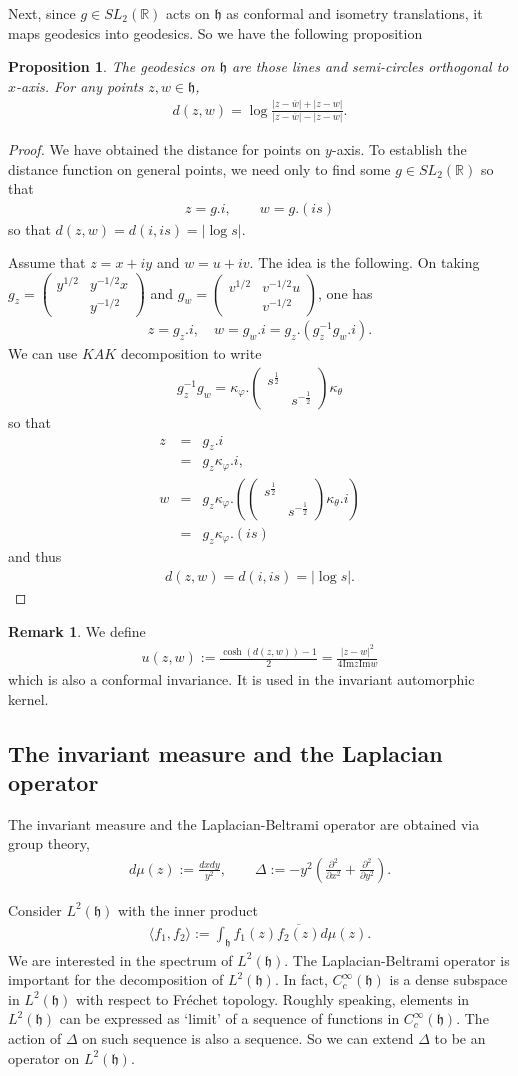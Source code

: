 \documentclass[11pt,reqno]{amsart}
\newcommand{\bea}{\begin{eqnarray}}
\newcommand{\eea}{\end{eqnarray}}
\newcommand{\bna}{\begin{eqnarray*}}
\newcommand{\ena}{\end{eqnarray*}}
\newcommand{\bma}{\begin{pmatrix}}
\newcommand{\ema}{\end{pmatrix}}
\newcommand{\mk}{\mathfrak}
\def\im{{\mathrm{Im}}}
\def\R{\mathbb{R}}
\newtheorem{prop}[lemma]{Proposition}
\theoremstyle{definition}
\newtheorem{remark}{Remark}
\begin{document}
Next, since $g\in SL_2(\R)$ acts on $\mk h$ as conformal and isometry translations,
it maps geodesics into geodesics. So we have the following proposition
\begin{prop}
The geodesics on $\mk h$ are those lines and semi-circles orthogonal to $x$-axis.
For any points $z,w\in \mk h$,
\bna
d(z,w)=\log\frac{|z-\overline w|+|z-w|}{|z-\overline w|-|z-w|}.
\ena
\end{prop}
\begin{proof}
We have obtained the distance for points on $y$-axis.
To establish the distance function on general  points,
we need only to find some $g\in SL_2(\R)$ so that
\bna
z=g.i,\qquad w=g.(is)
\ena
so that $d(z,w)=d(i,is)=|\log s|$.

Assume that $z=x+iy$ and $w=u+iv$. The idea is the following.
On taking $g_z=\bma y^{1/2}& y^{-1/2}x\\&y^{-1/2}\ema$ and $g_w=
\bma v^{1/2}& v^{-1/2}u\\&v^{-1/2}\ema$, one has
\bna
z=g_z.i,\quad w=g_w.i=g_z.(g_z^{-1}g_w.i).
\ena
We can use $KAK$ decomposition to write
\bna
g_z^{-1}g_w= \kappa_\varphi.\bma s^{\frac{1}{2}}&\\&s^{-\frac{1}{2}}\ema \kappa_\theta
\ena
so that
\bna
z&=&g_z.i\\
&=&g_z\kappa_\varphi.i,\\
w&=&g_z\kappa_\varphi.\left(\bma s^{\frac{1}{2}}&\\&s^{-\frac{1}{2}}\ema \kappa_\theta.i\right)\\
&=&g_z\kappa_\varphi.(is)
\ena
and thus
\bna
d(z,w)=d(i,is)=|\log s|.
\ena
\end{proof}
\begin{remark}We define
\bea
u(z,w):=\frac{\cosh(d(z,w))-1}{2}=\frac{|z-w|^2}{4\im z\im w}\label{u-function-conformal-invariance}
\eea
which is also a conformal invariance. It is used in the invariant automorphic kernel.
\end{remark}
\subsection{The invariant measure and the Laplacian operator}
The invariant measure and the Laplacian-Beltrami operator are obtained
via group theory,
\bna
 d\mu(z):=\frac{dxdy}{y^2},
 \qquad \Delta:=-y^2
 \left(\frac{\partial ^2}{\partial x^2}+\frac{\partial ^2}{\partial y^2}\right).
\ena

Consider $L^2(\mk h)$ with the inner product
\bna
\langle f_1,f_2\rangle:=\int_{\mathfrak h}f_1(z)\overline{f_2(z)}d\mu(z).
\ena
We are interested in the spectrum of $L^2(\mathfrak h)$.
The Laplacian-Beltrami operator is important for the decomposition of $L^2(\mk h)$.
In fact, $C_c^\infty(\mk h)$
is a dense subspace in $L^2(\mk h)$ with respect to Fr\'echet topology.
Roughly speaking, elements in $L^2(\mk h)$ can be expressed as `limit' of
 a sequence of
functions in $C_c^\infty(\mk h)$.
The action of $\Delta$ on such sequence is also a sequence.
So we can extend $\Delta$ to be an operator on $L^2(\mk h)$.
\end{document}
